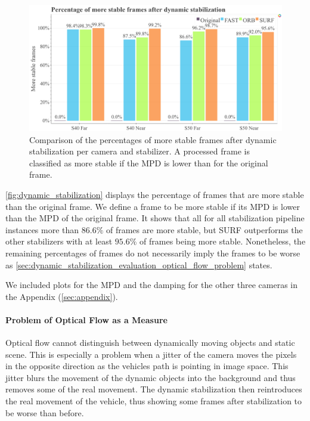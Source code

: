 \begin{figure}[!ht]
      \includegraphics[width=\linewidth]{diagrams/optical_flow/stats.html.png}    
    \caption{
        Comparison of the percentages of more stable frames after dynamic stabilization per camera and stabilizer.
        A processed frame is classified as more stable if the MPD is lower than for the original frame. 
    }
    \label{fig:dynamic_stabilization}
\end{figure}

\autoref{fig:dynamic_stabilization} displays the percentage of frames that are more stable than the original frame.
We define a frame to be more stable if its MPD is lower than the MPD of the original frame. 
It shows that all for all stabilization pipeline instances more than $86.6\%$ of frames are more stable, but SURF outperforms the other stabilizers with at least $95.6\%$ of frames being more stable.
Nonetheless, the remaining percentages of frames do not necessarily imply the frames to be worse as \autoref{sec:dynamic_stabilization_evaluation_optical_flow_problem} states.

We included plots for the MPD and the damping for the other three cameras in the Appendix (\autoref{sec:appendix}).




\paragraph{Problem of Optical Flow as a Measure}
\label{sec:dynamic_stabilization_evaluation_optical_flow_problem}
Optical flow cannot distinguish between dynamically moving objects and static scene.
This is especially a problem when a jitter of the camera moves the pixels in the opposite direction as the vehicles path is pointing in image space.
This jitter blurs the movement of the dynamic objects into the background and thus removes some of the real movement.
The dynamic stabilization then reintroduces the real movement of the vehicle, thus showing some frames after stabilization to be worse than before. 

